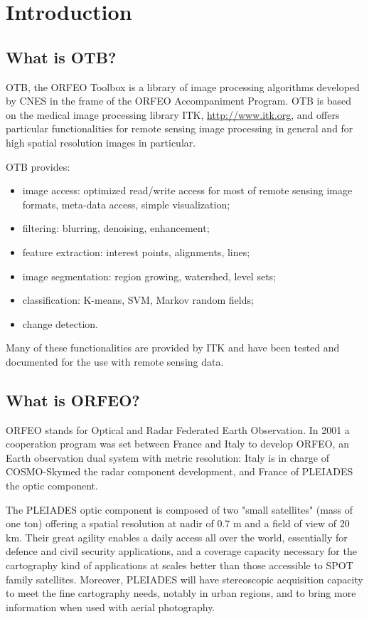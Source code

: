 \section{Introduction}
\subsection{What is OTB?}
OTB, the ORFEO Toolbox is a library of image processing algorithms developed by CNES in the
frame of the ORFEO Accompaniment Program. 
OTB is based on the medical image processing library ITK, \url{http://www.itk.org}, and offers
particular functionalities for remote sensing image processing in
general and for high spatial resolution images in particular.

OTB provides:
\begin{itemize}
\item image access: optimized read/write access for most of remote sensing
image formats, meta-data access, simple visualization;
\item filtering: blurring, denoising, enhancement;
\item feature extraction: interest points, alignments, lines;
\item image segmentation: region growing, watershed, level sets;
\item classification: K-means, SVM, Markov random fields; 
\item change detection.  
\end{itemize}


Many of these functionalities are provided by ITK and have been tested
and documented for the use with remote sensing data.

\subsection{What is ORFEO?}
ORFEO stands for Optical and Radar Federated Earth Observation.  In
2001 a cooperation program was set between France and Italy to develop
ORFEO, an Earth observation dual system with metric resolution: Italy
is in charge of COSMO-Skymed the radar component development, and
France of PLEIADES the optic component.

The PLEIADES optic component is composed of two "small satellites"
(mass of one ton) offering a spatial resolution at nadir of 0.7 m and
a field of view of 20 km. Their great agility enables a daily access
all over the world, essentially for defence and civil security
applications, and a coverage capacity necessary for the cartography
kind of applications at scales better than those accessible to SPOT
family satellites. Moreover, PLEIADES will have stereoscopic
acquisition capacity to meet the fine cartography needs, notably in
urban regions, and to bring more information when used with aerial
photography.


